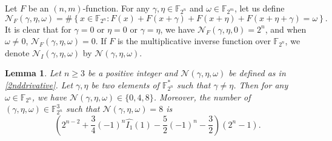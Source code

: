 \documentclass{article}
\newcommand{\F}{\mathbb{F}}
\newtheorem{lemma}{Lemma}
\theoremstyle{nonumberplain}
\newcommand{\0}{\textbf{0}}
\newcommand{\1}{\textbf{1}}
\begin{document}
Let $F$ be an $(n,m)$-function. For any $\gamma,\eta\in\F_{2^n}$ and
$\omega\in\F_{2^m}$, let us define
\begin{equation}
\label{2nddrivative}
\mathcal{N}_F(\gamma,\eta,\omega)=\#\left\{x\in\F_{2^n} : F(x)+F(x+\gamma)+F(x+\eta)+F(x+\eta+\gamma)=\omega\right\}.
\end{equation}
It is clear that for $\gamma=0$ or $\eta=0$ or $\gamma=\eta$, we have $\mathcal{N}_F(\gamma,\eta,0)=2^n$, and when $\omega\neq 0$, $\mathcal{N}_F(\gamma,\eta,\omega)=0$. If $F$ is the multiplicative inverse function over $\mathbb F_{2^n}$, we denote $\mathcal{N}_I(\gamma,\eta,\omega)$ by $\mathcal{N}(\gamma,\eta,\omega)$.

\begin{lemma}\label{Secondderivativesolution}
Let $n\geq 3$ be a positive integer and $\mathcal{N}(\gamma,\eta,\omega)$ be defined as in \eqref{2nddrivative}.
Let $\gamma,\eta$ be two elements of $\F_{2^n}^*$ such that $\gamma\neq \eta$. Then for any $\omega\in\F_{2^n}$,  we have $\mathcal{N}(\gamma,\eta,\omega)\in \{0,4,8\}$.
Moreover, the number of $(\gamma,\eta,\omega)\in\F_{2^n}^3$ such that $\mathcal{N}(\gamma,\eta,\omega)=8$ is
$$\left(2^{n-2}+\frac{3}{4}(-1)^{n}\widehat{I_1}(1)-\frac{5}{2}(-1)^{n}-\frac{3}{2}\right)\left(2^n-1\right).$$
\end{lemma}


        
\end{document}

